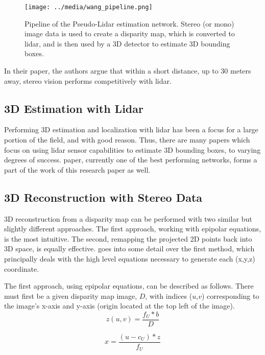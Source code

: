 \begin{figure}[h] %
    \texttt{[image: ../media/wang\_pipeline.png]}
    \caption{Pipeline of the Pseudo-Lidar estimation network. Stereo (or mono) image data is used to create a disparity map, which is converted to lidar, and is then used by a 3D detector to estimate 3D bounding boxes.}
    \label{wang_pipeline} %
\end{figure}

In their paper, the authors argue that within a short distance, up to 30 meters away, stereo vision performs competitively with lidar.

\subsection{3D Estimation with Lidar}
Performing 3D estimation and localization with lidar has been a focus for a large portion of the field, and with good reason. Thus, there are many papers which focus on using lidar sensor capabilities to estimate 3D bounding boxes, to varying degrees of success. \cite{qi_frustum_2017} paper, currently one of the best performing networks, forms a part of the work of this research paper as well. 

\subsection{3D Reconstruction with Stereo Data}
3D reconstruction from a disparity map can be performed with two similar but slightly different approaches. The first approach, working with epipolar equations, is the most intuitive. The second, remapping the projected 2D points back into 3D space, is equally effective. \cite{szeliski_computer_2010} goes into some detail over the first method, which principally deals with the high level equations necessary to generate each (x,y,z) coordinate.

The first approach, using epipolar equations, can be described as follows. There must first be a given disparity map image, $D$, with indices ($u$,$v$) corresponding to the image's x-axis and y-axis (origin located at the top left of the image). 
\begin{equation}
z(u,v) = \frac{f_U * b}{D}
\end{equation}

\begin{equation}
x = \frac{(u - c_U) * z}{f_U}
\end{equation}

